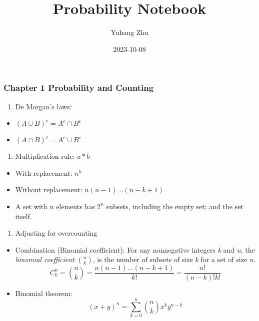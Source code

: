 \documentclass[
]{article}
\title{Probability Notebook}
\author{Yuhang Zhu}
\date{2023-10-08}
\providecommand{\tightlist}{%
  \setlength{\itemsep}{0pt}\setlength{\parskip}{0pt}}
\begin{document}
\maketitle

\hypertarget{chapter-1-probability-and-counting}{%
\subsubsection{Chapter 1 Probability and
Counting}\label{chapter-1-probability-and-counting}}

\begin{enumerate}
\def\labelenumi{\arabic{enumi}.}
\tightlist
\item
  De Morgan's laws:
\end{enumerate}

\begin{itemize}
\tightlist
\item
  \((A \cup B)^c = A^c \cap B^c\)
\item
  \((A \cap B)^c = A^c \cup B^c\)
\end{itemize}

\begin{enumerate}
\def\labelenumi{\arabic{enumi}.}
\setcounter{enumi}{1}
\tightlist
\item
  Multiplication rule: \(a*b\)
\end{enumerate}

\begin{itemize}
\tightlist
\item
  With replacement: \(n^k\)
\item
  Without replacement: \(n(n - 1)...(n-k+1)\)
\item
  A set with n elements has \(2^n\) subsets, including the empty set;
  and the set itself.
\end{itemize}

\begin{enumerate}
\def\labelenumi{\arabic{enumi}.}
\setcounter{enumi}{2}
\tightlist
\item
  Adjusting for overcounting
\end{enumerate}

\begin{itemize}
\tightlist
\item
  Combination (Binomial coefficient): For any nonnegative integers
  \emph{k} and \emph{n}, the \emph{binomial coefficient}
  \({n \choose k}\), is the number of subsets of size \emph{k} for a set
  of size \emph{n}.
  \[ C^{n}_{k} = {n \choose k} = \frac{n(n - 1) \ldots (n-k+1)}{k!} = \frac{n!}{(n - k)!k!} \]
\item
  Binomial theorem:
  \[ (x + y)^n = \sum_{k=0}^{n}{n \choose k}x^ky^{n-k} \]
\end{itemize}
\end{document}
